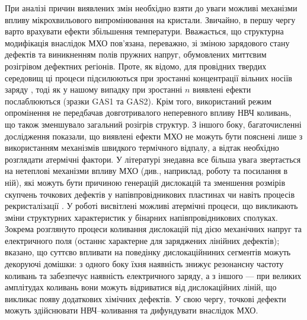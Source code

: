 При аналізі причин виявлених змін необхідно взяти до уваги можливі механізми впливу
мікрохвильового випромінювання на кристали.
Звичайно, в першу чергу варто врахувати ефекти збільшення температури.
Вважається, що  структурна модифікація внаслідок МХО пов'язана, переважно,
зі зміною зарядового стану дефектів та виникненням полів пружних напруг, обумовлених миттєвим розігрівом дефектних регіонів.
Проте, як відомо, для провідних твердих середовищ ці процеси підсилюються при зростанні концентрації вільних носіїв заряду \cite{MW:Rev}, тоді як у нашому випадку при зростанні $n$ виявлені ефекти послаблюються (зразки GAS1 та GAS2).
Крім того, використаний режим опромінення не передбачав довготривалого неперевного впливу НВЧ коливань, що також зменшувало загальний розігрів структур.
З іншого боку, багаточисленні дослідження показали, що виявлені ефекти МХО не можуть бути пояснені лише з використанням механізмів швидкого термічного відпалу, а відтак необхідно розглядати атермічні фактори.
У літературі знедавна все більша увага звертається на нетеплові механізми впливу МХО (див., наприклад, роботу \cite{MW:Si2018} та посилання в ній), які можуть бути причиною генерацій дислокацій та зменшення розмірів скупчень точкових дефектів у напівпровідникових пластинах \cite{Konakova2007JTF} чи навіть процесів рекристалізації \cite{MW:Si2018}.
У роботі \cite{Konakova2007JTF} висвітлені можливі атермічні процеси, що викликають зміни структурних характеристик у бінарних напівпровідникових сполуках.
Зокрема розглянуто процеси коливання дислокацій під дією механічних напруг та електричного поля (останнє характерне для заряджених лінійних дефектів);
вказано, що суттєво впливати на поведінку дислокаційниних сегментів можуть декоруючі домішки:
з одного боку їхня наявність знижує резонансну частоту коливань та забезпечує наявність електричного заряду,
а з іншого --- при великих амплітудах коливань вони можуть відриватися від дислокаційних ліній, що викликає появу додаткових хімічних дефектів.
У свою чергу, точкові дефекти можуть здійснювати НВЧ--коливання та дифундувати внаслідок МХО.



